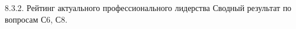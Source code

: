 \begin{frame}{8.3.2. Рейтинг актуального профессионального лидерства}
\tiny 
Сводный результат по вопросам С6, С8.

\fontsize{5pt}{5}\selectfont
\begin{center}
\begin{tabular}{cllc}

\end{tabular}
\end{center}
\end{frame}



